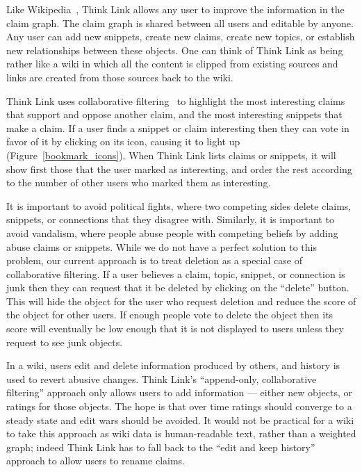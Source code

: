 \documentclass{chi2009}
\begin{document}
Like Wikipedia~\cite{wikipedia}, Think Link allows any user to improve the information in the claim graph. The claim graph is shared between all users and editable by anyone. Any user can add new snippets, create new claims, create new topics, or establish new relationships between these objects. One can think of Think Link as being rather like a wiki in which all the content is clipped from existing sources and links are created from those sources back to the wiki.

Think Link uses collaborative filtering~\cite{collective} to highlight the most interesting claims that support and oppose another claim, and the most interesting snippets that make a claim. If a user finds a snippet or claim interesting then they can vote in favor of it by clicking on its icon, causing it to light up (Figure~\ref{bookmark_icons}). When Think Link lists claims or snippets, it will show first those that the user marked as interesting, and order the rest according to the number of other users who marked them as interesting.

It is important to avoid political fights, where two competing sides delete claims, snippets, or connections that they disagree with. Similarly, it is important to avoid vandalism, where people abuse people with competing beliefs by adding abuse claims or snippets. While we do not have a perfect solution to this problem, our current approach is to treat deletion as a special case of collaborative filtering. If a user believes a claim, topic, snippet, or connection is junk then they can request that it be deleted by clicking on the ``delete'' button. This will hide the object for the user who request deletion and reduce the score of the object for other users. If enough people vote to delete the object then its score will eventually be low enough that it is not displayed to users unless they request to see junk objects. 

In a wiki, users edit and delete information produced by others, and history is used to revert abusive changes. Think Link's ``append-only, collaborative filtering'' approach only allows users to add information --- either new objects, or ratings for those objects. The hope is that over time ratings should converge to a steady state and edit wars should be avoided. It would not be practical for a wiki to take this approach as wiki data is human-readable text, rather than a weighted graph; indeed Think Link has to fall back to the ``edit and keep history'' approach to allow users to rename claims.
\end{document}
